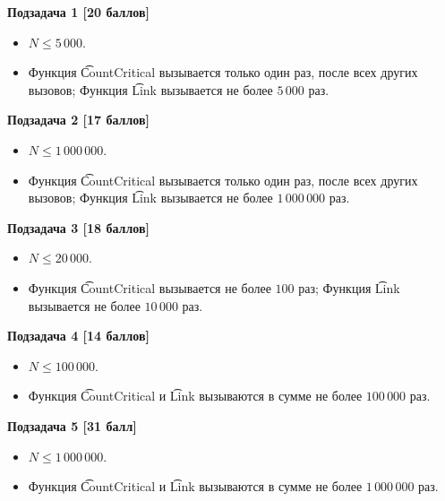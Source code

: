 \bf{Подзадача 1 [20 баллов]}

\begin{itemize}
\item $N \le 5\,000$.
\item Функция \t{CountCritical} вызывается только один раз, после всех других вызовов; Функция \t{Link} вызывается не более $5\,000$ раз.
\end{itemize}

\bf{Подзадача 2 [17 баллов]}

\begin{itemize}
\item $N \le 1\,000\,000$.
\item Функция \t{CountCritical} вызывается только один раз, после всех других вызовов; Функция \t{Link} вызывается не более $1\,000\,000$ раз.
\end{itemize}

\bf{Подзадача 3 [18 баллов]}

\begin{itemize}
\item $N \le 20\,000$.
\item Функция \t{CountCritical} вызывается не более $100$ раз; Функция \t{Link} вызывается не более $10\,000$ раз.
\end{itemize}

\bf{Подзадача 4 [14 баллов]}

\begin{itemize}
\item $N \le 100\,000$.
\item Функция \t{CountCritical} и \t{Link} вызываются в сумме не более $100\,000$ раз. 
\end{itemize}

\bf{Подзадача 5 [31 балл]}

\begin{itemize}
\item $N \le 1\,000\,000$.
\item Функция \t{CountCritical} и \t{Link} вызываются в сумме не более $1\,000\,000$ раз. 
\end{itemize}
